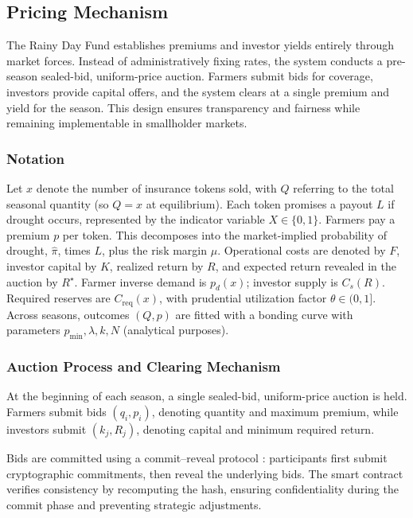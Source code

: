 \documentclass[11pt,a4paper]{article}
\begin{document}
	\subsection{Pricing Mechanism}

The Rainy Day Fund establishes premiums and investor yields entirely through market forces. Instead of administratively fixing rates, the system conducts a pre-season sealed-bid, uniform-price auction. Farmers submit bids for coverage, investors provide capital offers, and the system clears at a single premium and yield for the season. This design ensures transparency and fairness while remaining implementable in smallholder markets.  

	\subsubsection{Notation}

Let $x$ denote the number of insurance tokens sold, with $Q$ referring to the total seasonal quantity (so $Q=x$ at equilibrium). Each token promises a payout $L$ if drought occurs, represented by the indicator variable $X \in \{0,1\}$. Farmers pay a premium $p$ per token. This decomposes into the market-implied probability of drought, $\hat{\pi}$, times $L$, plus the risk margin $\mu$. Operational costs are denoted by $F$, investor capital by $K$, realized return by $R$, and expected return revealed in the auction by $R^\star$. Farmer inverse demand is $p_d(x)$; investor supply is $C_s(R)$. Required reserves are $C_{\mathrm{req}}(x)$, with prudential utilization factor $\theta \in (0,1]$. Across seasons, outcomes $(Q,p)$ are fitted with a bonding curve with parameters $p_{\min}, \lambda, k, N$ (analytical purposes).  

	\subsubsection{Auction Process and Clearing Mechanism}

At the beginning of each season, a single sealed-bid, uniform-price auction is held. Farmers submit bids $(q_i, p_i)$, denoting quantity and maximum premium, while investors submit $(k_j, R_j)$, denoting capital and minimum required return.  

Bids are committed using a commit--reveal protocol \citep{blum1983coinflipping,buterin2015commit}: participants first submit cryptographic commitments, then reveal the underlying bids. The smart contract verifies consistency by recomputing the hash, ensuring confidentiality during the commit phase and preventing strategic adjustments.  
\end{document}
